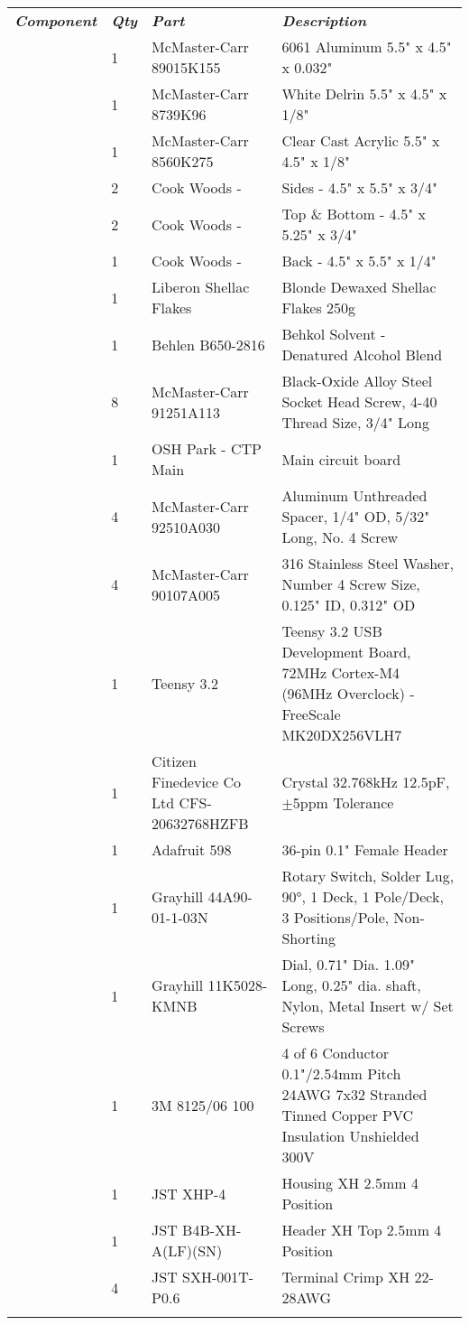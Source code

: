 \tiny
{}
\begin{longtabu}{X[3,c,m] X[1,c,m] X[3,c,m] X[5,l,m]}
  \thrule
  \textit{\bfseries\normalsize Component} & \textit{\bfseries\normalsize Qty} & \textit{\bfseries\normalsize Part} & \textit{\bfseries\normalsize Description} \\ \mrule

   & 1 & McMaster-Carr 89015K155 & 6061 Aluminum 5.5" x 4.5" x 0.032" \\
  & 1 & McMaster-Carr 8739K96 & White Delrin 5.5" x 4.5" x 1/8" \\
  & 1 & McMaster-Carr 8560K275 & Clear Cast Acrylic 5.5" x 4.5" x 1/8" \\
  & 2 & Cook Woods - \wood{} & Sides - 4.5" x 5.5" x 3/4" \\
  & 2 & Cook Woods - \wood{} & Top \& Bottom - 4.5" x 5.25" x 3/4" \\
  & 1 & Cook Woods - \wood{} & Back - 4.5" x 5.5" x 1/4" \\
  & 1 & Liberon Shellac Flakes & Blonde Dewaxed Shellac Flakes 250g \\
  & 1 & Behlen B650-2816 & Behkol Solvent - Denatured Alcohol Blend \\
  & 8 & McMaster-Carr 91251A113 & Black-Oxide Alloy Steel Socket Head Screw, 4-40 Thread Size, 3/4" Long \\ \mrule

   & 1 & OSH Park - CTP Main & Main circuit board \\
  & 4 & McMaster-Carr 92510A030 & Aluminum Unthreaded Spacer, 1/4" OD, 5/32" Long, No. 4 Screw \\
  & 4 & McMaster-Carr 90107A005 & 316 Stainless Steel Washer, Number 4 Screw Size, 0.125" ID, 0.312" OD \\ \mrule

   & 1 & Teensy 3.2 & Teensy 3.2 USB Development Board, 72MHz Cortex-M4 (96MHz Overclock) - FreeScale MK20DX256VLH7 \\
  & 1 & Citizen Finedevice Co Ltd CFS-20632768HZFB & Crystal 32.768kHz 12.5pF, $\pm$5ppm Tolerance \\
  & 1 & Adafruit 598 & 36-pin 0.1" Female Header \\ \mrule

   & 1 & Grayhill 44A90-01-1-03N & Rotary Switch, Solder Lug, 90°, 1 Deck, 1 Pole/Deck, 3 Positions/Pole, Non-Shorting \\
  & 1 & Grayhill 11K5028-KMNB & Dial, 0.71" Dia. 1.09" Long, 0.25" dia. shaft, Nylon, Metal Insert w/ Set Screws \\
  & 1 & 3M 8125/06 100 & 4 of 6 Conductor 0.1"/2.54mm Pitch 24AWG 7x32 Stranded Tinned Copper PVC Insulation Unshielded 300V \\
  & 1 & JST XHP-4 & Housing XH 2.5mm 4 Position \\
  & 1 & JST B4B-XH-A(LF)(SN) & Header XH Top 2.5mm 4 Position \\
  & 4 & JST SXH-001T-P0.6 & Terminal Crimp XH 22-28AWG \\ \mrule


\end{longtabu}
